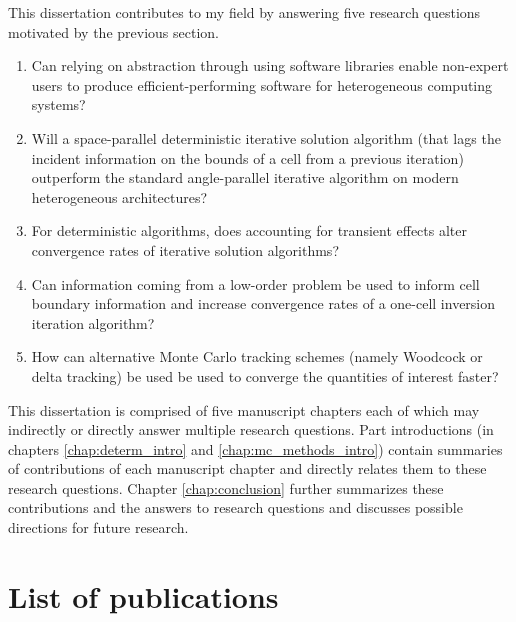 This dissertation contributes to my field by answering five research questions motivated by the previous section.
\begin{enumerate}
    \item Can relying on abstraction through using software libraries enable non-expert users to produce efficient-performing software for heterogeneous computing systems?
    \item Will a space-parallel deterministic iterative solution algorithm (that lags the incident information on the bounds of a cell from a previous iteration) outperform the standard angle-parallel iterative algorithm on modern heterogeneous architectures?
    \item For deterministic algorithms, does accounting for transient effects alter convergence rates of iterative solution algorithms?
    \item Can information coming from a low-order problem be used to inform cell boundary information and increase convergence rates of a one-cell inversion iteration algorithm?
    \item How can alternative Monte Carlo tracking schemes (namely Woodcock or delta tracking) be used be used to converge the quantities of interest faster?
\end{enumerate}

This dissertation is comprised of five manuscript chapters each of which may indirectly or directly answer multiple research questions.
Part introductions (in chapters \ref{chap:determ_intro} and \ref{chap:mc_methods_intro}) contain summaries of contributions of each manuscript chapter and directly relates them to these research questions.
Chapter \ref{chap:conclusion} further summarizes these contributions and the answers to research questions and discusses possible directions for future research.



\section{List of publications}

